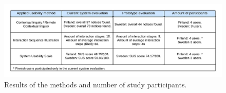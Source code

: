 \documentclass[12pt,a4paper,oneside,pdftex]{report}
\begin{document}
\begin{figure}[H]
  	\centerline{
    	   \includegraphics[width=1.3\textwidth]{./images/methodresult.png}
    	   }
  	   \caption{Results of the methods and number of study participants.}
	   \label{fig:methodresults}
\end{figure}



    
\end{document}

